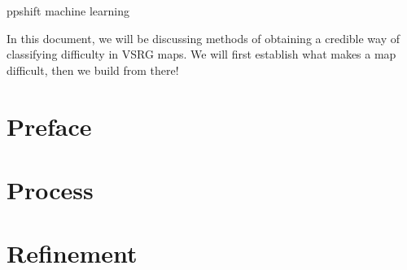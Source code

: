 \documentclass{article}
\begin{document}
	ppshift machine learning
	
	In this document, we will be discussing methods of obtaining a credible way of classifying difficulty in VSRG maps. We will first establish what makes a map difficult, then we build from there!
	
\newpage
\part{Preface}


\newpage


\newpage
\part{Process}
		


\newpage

\newpage

\newpage


\newpage
\part{Refinement}

\end{document}
